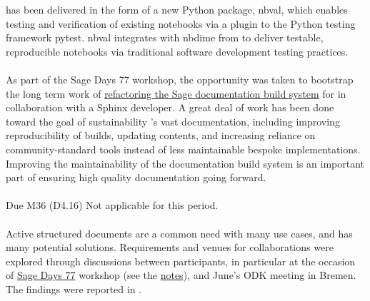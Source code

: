 \documentclass{deliverablereport}
\begin{document}
 has been delivered in the form of a new Python package, nbval,
which enables testing and verification of existing notebooks via a plugin to the Python testing
framework pytest. nbval integrates with nbdime from  to deliver
testable, reproducible notebooks via traditional software development testing practices.


\paragraph{}
\label{UI@sage-sphinx}

As part of the Sage Days 77 workshop, the opportunity was taken to bootstrap the long term work of
\href{https://wiki.sagemath.org/days77/documentation}{refactoring the Sage documentation build
system} for  in collaboration with a Sphinx developer. A great deal
of work has been done toward the goal of sustainability \Sage's vast documentation, including
improving reproducibility of builds, updating contents, and increasing reliance on
community-standard tools instead of less maintainable bespoke
implementations. Improving the maintainability of the \Sage
documentation build system is an important part of ensuring high quality documentation going forward.

\paragraph{} Due M36 (D4.16)
Not applicable for this period.

\paragraph{}

Active structured documents are a common need with many use cases, and has many potential solutions.
Requirements and venues for collaborations were explored through discussions between participants,
in particular at the occasion of \href{https://wiki.sagemath.org/days77/}{Sage Days 77} workshop
(see the \href{https://wiki.sagemath.org/days77/live-structured-documents}{notes}), and June's ODK
meeting in Bremen. The findings were reported in .
\end{document}
